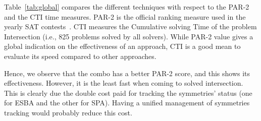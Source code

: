 Table~\ref{tab:global} compares the different techniques with respect to the
PAR-2 and the CTI time measures. PAR-2 is the official ranking measure used in
the yearly SAT contests~\cite{jarvisalo2012international}. CTI measures the
Cumulative solving Time of the problem Intersection (i.e., 825 problems solved
by all solvers). While PAR-2 value gives a global indication on the
effectiveness of an approach, CTI is a good mean to evaluate its speed compared
to other approaches.

Hence, we observe that the combo has a better PAR-2 score, and this shows its
effectiveness. However, it is the least fast when coming to solved intersection.
This is clearly due the double cost paid for tracking the symmetries' status
(one for ESBA and the other for SPA). Having a unified management of
symmetries tracking would probably reduce this cost.


